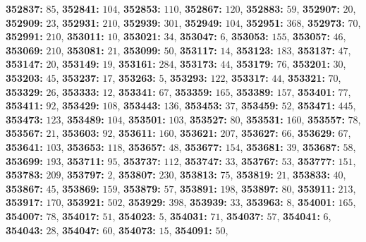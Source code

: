\textsf{\bfseries 352837:} $85$, \textsf{\bfseries 352841:} $104$, \textsf{\bfseries 352853:} $110$, \textsf{\bfseries 352867:} $120$, \textsf{\bfseries 352883:} $59$, \textsf{\bfseries 352907:} $20$, \textsf{\bfseries 352909:} $23$, \textsf{\bfseries 352931:} $210$, \textsf{\bfseries 352939:} $301$, \textsf{\bfseries 352949:} $104$, \textsf{\bfseries 352951:} $368$, \textsf{\bfseries 352973:} $70$, \textsf{\bfseries 352991:} $210$, \textsf{\bfseries 353011:} $10$, \textsf{\bfseries 353021:} $34$, \textsf{\bfseries 353047:} $6$, \textsf{\bfseries 353053:} $155$, \textsf{\bfseries 353057:} $46$, \textsf{\bfseries 353069:} $210$, \textsf{\bfseries 353081:} $21$, \textsf{\bfseries 353099:} $50$, \textsf{\bfseries 353117:} $14$, \textsf{\bfseries 353123:} $183$, \textsf{\bfseries 353137:} $47$, \textsf{\bfseries 353147:} $20$, \textsf{\bfseries 353149:} $19$, \textsf{\bfseries 353161:} $284$, \textsf{\bfseries 353173:} $44$, \textsf{\bfseries 353179:} $76$, \textsf{\bfseries 353201:} $30$, \textsf{\bfseries 353203:} $45$, \textsf{\bfseries 353237:} $17$, \textsf{\bfseries 353263:} $5$, \textsf{\bfseries 353293:} $122$, \textsf{\bfseries 353317:} $44$, \textsf{\bfseries 353321:} $70$, \textsf{\bfseries 353329:} $26$, \textsf{\bfseries 353333:} $12$, \textsf{\bfseries 353341:} $67$, \textsf{\bfseries 353359:} $165$, \textsf{\bfseries 353389:} $157$, \textsf{\bfseries 353401:} $77$, \textsf{\bfseries 353411:} $92$, \textsf{\bfseries 353429:} $108$, \textsf{\bfseries 353443:} $136$, \textsf{\bfseries 353453:} $37$, \textsf{\bfseries 353459:} $52$, \textsf{\bfseries 353471:} $445$, \textsf{\bfseries 353473:} $123$, \textsf{\bfseries 353489:} $104$, \textsf{\bfseries 353501:} $103$, \textsf{\bfseries 353527:} $80$, \textsf{\bfseries 353531:} $160$, \textsf{\bfseries 353557:} $78$, \textsf{\bfseries 353567:} $21$, \textsf{\bfseries 353603:} $92$, \textsf{\bfseries 353611:} $160$, \textsf{\bfseries 353621:} $207$, \textsf{\bfseries 353627:} $66$, \textsf{\bfseries 353629:} $67$, \textsf{\bfseries 353641:} $103$, \textsf{\bfseries 353653:} $118$, \textsf{\bfseries 353657:} $48$, \textsf{\bfseries 353677:} $154$, \textsf{\bfseries 353681:} $39$, \textsf{\bfseries 353687:} $58$, \textsf{\bfseries 353699:} $193$, \textsf{\bfseries 353711:} $95$, \textsf{\bfseries 353737:} $112$, \textsf{\bfseries 353747:} $33$, \textsf{\bfseries 353767:} $53$, \textsf{\bfseries 353777:} $151$, \textsf{\bfseries 353783:} $209$, \textsf{\bfseries 353797:} $2$, \textsf{\bfseries 353807:} $230$, \textsf{\bfseries 353813:} $75$, \textsf{\bfseries 353819:} $21$, \textsf{\bfseries 353833:} $40$, \textsf{\bfseries 353867:} $45$, \textsf{\bfseries 353869:} $159$, \textsf{\bfseries 353879:} $57$, \textsf{\bfseries 353891:} $198$, \textsf{\bfseries 353897:} $80$, \textsf{\bfseries 353911:} $213$, \textsf{\bfseries 353917:} $170$, \textsf{\bfseries 353921:} $502$, \textsf{\bfseries 353929:} $398$, \textsf{\bfseries 353939:} $33$, \textsf{\bfseries 353963:} $8$, \textsf{\bfseries 354001:} $165$, \textsf{\bfseries 354007:} $78$, \textsf{\bfseries 354017:} $51$, \textsf{\bfseries 354023:} $5$, \textsf{\bfseries 354031:} $71$, \textsf{\bfseries 354037:} $57$, \textsf{\bfseries 354041:} $6$, \textsf{\bfseries 354043:} $28$, \textsf{\bfseries 354047:} $60$, \textsf{\bfseries 354073:} $15$, \textsf{\bfseries 354091:} $50$, 
